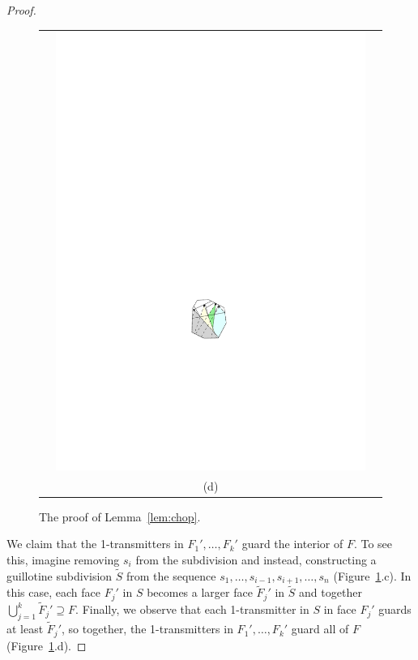 \documentclass{article}
\begin{document}
\begin{proof}
\begin{figure}
\begin{center}
\begin{tabular}{ccc}
      & \includegraphics{chop-d} &  \\  
      & (d) &  \\  
    \end{tabular}
  \end{center}
  \caption{The proof of Lemma~\ref{lem:chop}.}
  \label{fig:chop}
\end{figure}

We claim that the 1-transmitters in $F_1',\ldots,F_k'$ guard the interior
of $F$.  To see this, imagine removing $s_i$ from the subdivision and
instead, constructing a guillotine subdivision $\tilde{S}$ from the sequence
$s_1,\ldots,s_{i-1},s_{i+1},\ldots,s_n$ (Figure~\ref{fig:chop}.c).
In this case, each face $F_j'$ in $S$ becomes a larger face $\tilde F_j'$
in $\tilde{S}$ and together $\bigcup_{j=1}^k \tilde F_j'\supseteq F$.  Finally,
we observe that each 1-transmitter in $S$ in face $F_j'$ guards at least
$\tilde F_j'$, so together, the 1-transmitters in $F_1',\ldots,F_k'$
guard all of $F$ (Figure~\ref{fig:chop}.d).
\end{proof}
\end{document}
